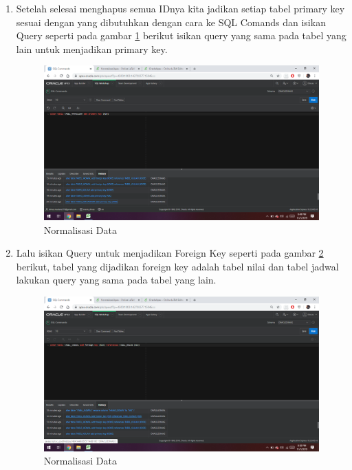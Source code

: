 \documentclass[12pt, times new roman, a4paper]{article}
\begin{document}
\begin{enumerate}
    \item Setelah selesai menghapus semua IDnya kita jadikan setiap tabel primary key sesuai dengan yang dibutuhkan dengan cara ke SQL Comands dan isikan Query seperti pada gambar \ref{apex6}
    berikut isikan query yang sama pada tabel yang lain untuk menjadikan primary key.
    \begin{figure}[!htbp]
        \centering
        \includegraphics[scale=0.25]{figures/apex6.png}
        \caption{Normalisasi Data}
        \label{apex6}
    \end{figure}
    \item Lalu isikan Query untuk menjadikan Foreign Key seperti pada gambar \ref{apex7} berikut, tabel yang dijadikan foreign key adalah tabel nilai dan tabel jadwal lakukan query yang sama pada tabel yang lain.
        \begin{figure}[!htbp]
        \centering
        \includegraphics[scale=0.3]{figures/apex7.png}
        \caption{Normalisasi Data}
        \label{apex7}
    \end{figure}
\end{enumerate}
\end{document}
